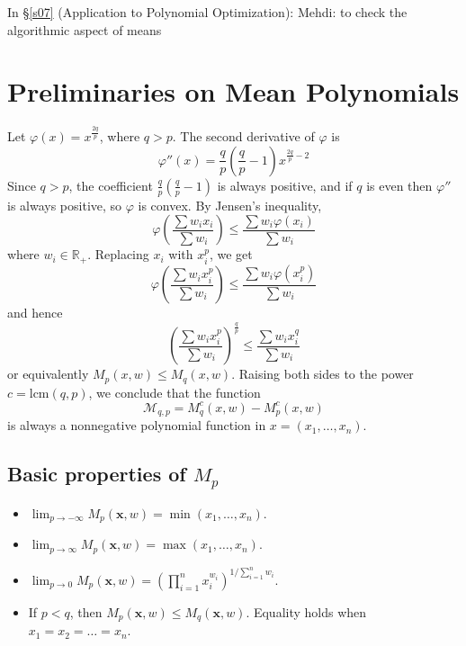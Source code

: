 \documentclass{article}
\begin{document}
In \S\ref{s07} (Application to Polynomial Optimization): Mehdi: to check the algorithmic aspect of means



\section{Preliminaries on Mean Polynomials}\label{s01}

Let $\varphi(x) = x^{\frac{2q}{p}}$, where $q > p$. The second derivative of $\varphi$ is
\[
   \varphi''(x) = \frac{q}{p}\left(\frac{q}{p}-1\right)x^{\frac{2q}{p}-2}
\]
Since $q > p$, the coefficient $\frac{q}{p}\left(\frac{q}{p}-1\right)$ is always positive, and if $q$ is even then
$\varphi''$ is always positive, so $\varphi$ is convex. By Jensen's inequality,
\[
   \varphi\left(\frac{\sum w_i x_i}{\sum w_i}\right) \leq \frac{\sum w_i \varphi(x_i)}{\sum w_i}
\]
where $w_i \in \mathbb{R}_+$. Replacing $x_i$ with $x_i^p$, we get
\[
   \varphi\left(\frac{\sum w_i x_i^p}{\sum w_i}\right) \leq \frac{\sum w_i \varphi(x_i^p)}{\sum w_i}
\]
and hence
\[
   \left(\frac{\sum w_i x_i^p}{\sum w_i}\right)^{\frac{q}{p}} \leq \frac{\sum w_i x_i^{q}}{\sum w_i}
\]
or equivalently $M_p(x, w) \leq M_q(x, w)$. Raising both sides to the power $c = \mathrm{lcm}(q, p)$, we conclude that
the function
\[
   \mathcal{M}_{q,p} = M_q^c(x, w) - M_p^c(x, w)
\]
is always a nonnegative polynomial function in $x = (x_1, \dots, x_n)$.

\subsection*{Basic properties of $M_p$}
\begin{itemize}
   \item $\displaystyle \lim_{p \rightarrow -\infty} M_p(\mathbf{x}, w) = \min(x_1, \dots, x_n)$.
   \item $\displaystyle \lim_{p \rightarrow \infty} M_p(\mathbf{x}, w) = \max(x_1, \dots, x_n)$.
   \item $\displaystyle \lim_{p \rightarrow 0} M_p(\mathbf{x}, w) = \left( \prod_{i=1}^n x_i^{w_i} \right)^{1/\sum_{i=1}^n w_i}$.
   \item If $p < q$, then $M_p(\mathbf{x}, w) \leq M_q(\mathbf{x}, w)$. Equality holds when $x_1 = x_2 = \dots = x_n$.
\end{itemize}
\end{document}
